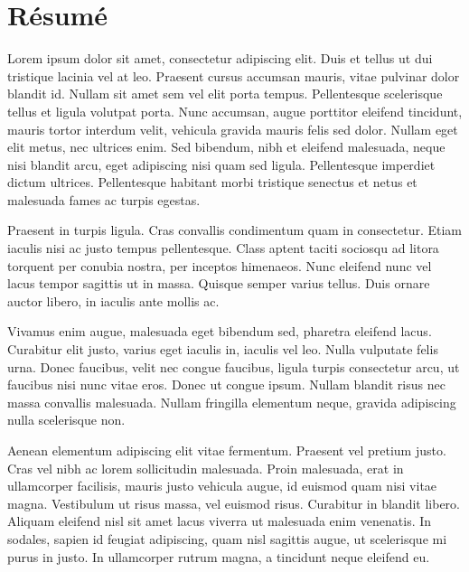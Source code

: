 \documentclass[a4paper,11pt]{scrbook}
\begin{document}
\frontmatter
\setcounter{tocdepth}{3}
\setcounter{secnumdepth}{3}

\begin{titlepage}

\end{titlepage}
\newpage
\thispagestyle{empty}
\null

\chapter*{Résumé}
\thispagestyle{empty}

Lorem ipsum dolor sit amet, consectetur adipiscing elit. Duis et tellus ut dui tristique lacinia vel at leo. Praesent cursus accumsan mauris, vitae pulvinar dolor blandit id. Nullam sit amet sem vel elit porta tempus. Pellentesque scelerisque tellus et ligula volutpat porta. Nunc accumsan, augue porttitor eleifend tincidunt, mauris tortor interdum velit, vehicula gravida mauris felis sed dolor. Nullam eget elit metus, nec ultrices enim. Sed bibendum, nibh et eleifend malesuada, neque nisi blandit arcu, eget adipiscing nisi quam sed ligula. Pellentesque imperdiet dictum ultrices. Pellentesque habitant morbi tristique senectus et netus et malesuada fames ac turpis egestas.

Praesent in turpis ligula. Cras convallis condimentum quam in consectetur. Etiam iaculis nisi ac justo tempus pellentesque. Class aptent taciti sociosqu ad litora torquent per conubia nostra, per inceptos himenaeos. Nunc eleifend nunc vel lacus tempor sagittis ut in massa. Quisque semper varius tellus. Duis ornare auctor libero, in iaculis ante mollis ac.

Vivamus enim augue, malesuada eget bibendum sed, pharetra eleifend lacus. Curabitur elit justo, varius eget iaculis in, iaculis vel leo. Nulla vulputate felis urna. Donec faucibus, velit nec congue faucibus, ligula turpis consectetur arcu, ut faucibus nisi nunc vitae eros. Donec ut congue ipsum. Nullam blandit risus nec massa convallis malesuada. Nullam fringilla elementum neque, gravida adipiscing nulla scelerisque non.

Aenean elementum adipiscing elit vitae fermentum. Praesent vel pretium justo. Cras vel nibh ac lorem sollicitudin malesuada. Proin malesuada, erat in ullamcorper facilisis, mauris justo vehicula augue, id euismod quam nisi vitae magna. Vestibulum ut risus massa, vel euismod risus. Curabitur in blandit libero. Aliquam eleifend nisl sit amet lacus viverra ut malesuada enim venenatis. In sodales, sapien id feugiat adipiscing, quam nisl sagittis augue, ut scelerisque mi purus in justo. In ullamcorper rutrum magna, a tincidunt neque eleifend eu.
\end{document}
